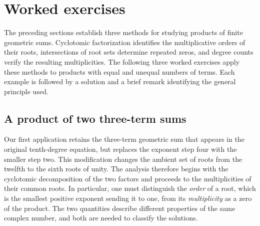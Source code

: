 \documentclass[11pt,a4paper]{article}
\numberwithin{equation}{section}
\theoremstyle{uprightpaper}
\begin{document}
\section{Worked exercises}\label{sec:exercise-section}

The preceding sections establish three methods for studying products of finite geometric sums. Cyclotomic factorization identifies the multiplicative orders of their roots, intersections of root sets determine repeated zeros, and degree counts verify the resulting multiplicities. The following three worked exercises apply these methods to products with equal and unequal numbers of terms. Each example is followed by a solution and a brief remark identifying the general principle used.

\subsection{A product of two three-term sums}\label{subsec:exercise-one}

Our first application retains the three-term geometric sum that appears in the original tenth-degree equation, but replaces the exponent step four with the smaller step two. This modification changes the ambient set of roots from the twelfth to the sixth roots of unity. The analysis therefore begins with the cyclotomic decomposition of the two factors and proceeds to the multiplicities of their common roots. In particular, one must distinguish the \emph{order} of a root, which is the smallest positive exponent sending it to one, from its \emph{multiplicity} as a zero of the product. The two quantities describe different properties of the same complex number, and both are needed to classify the solutions.
\end{document}
